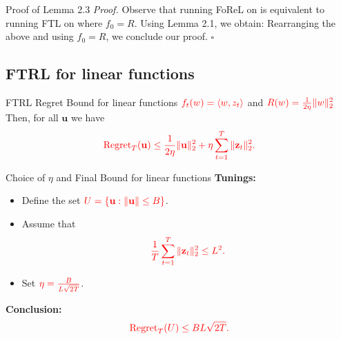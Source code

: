\documentclass[handout]{beamer}
\begin{document}
\begin{frame}{Proof of Lemma 2.3}
    \textit{Proof.} Observe that running FoReL on  is equivalent to running FTL on  where $f_0 = R$. Using Lemma 2.1, we obtain:
    Rearranging the above and using $f_0 = R$, we conclude our proof. \hfill $\square$
  \end{frame}

  \subsection{FTRL for linear functions}
  \begin{frame}{FTRL Regret Bound for linear functions}
     $\textcolor{red}{f_t(w) = \langle w,z_t\rangle}$ and $\textcolor{red}{R(w) = \frac{1}{2\eta}\|w\|_2^2}$\\
     
    Then, for all \(\mathbf{u}\) we have
    \begin{equation*}
        \textcolor{red}{\text{Regret}_T(\mathbf{u}) \leq \frac{1}{2\eta} \|\mathbf{u}\|_2^2 + \eta \sum_{t=1}^{T} \|\mathbf{z}_t\|_2^2.}
    \end{equation*}
\end{frame}

\begin{frame}{Choice of \(\eta\) and Final Bound for linear functions}
    \textbf{Tunings:}
    \begin{itemize}
        \item Define the set \(\textcolor{red}{U = \{\mathbf{u} : \|\mathbf{u}\| \leq B\}}\).
        \item Assume that
        \[
        \textcolor{red}{\frac{1}{T} \sum_{t=1}^{T} \|\mathbf{z}_t\|_2^2 \leq L^2.}
        \]
        \item Set \(\textcolor{red}{\eta = \frac{B}{L\sqrt{2T}}}\).
    \end{itemize}

    \textbf{Conclusion:}
    \begin{equation*}
        \textcolor{red}{\text{Regret}_T(U) \leq B L \sqrt{2T}.}
    \end{equation*}
\end{frame}
\end{document}
